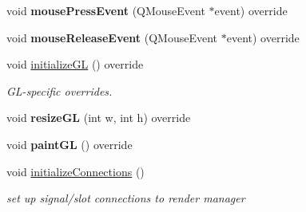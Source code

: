 \begin{Indent}
\begin{DoxyCompactItemize}
\item 
\mbox{\label{classrev_1_1_view_1_1_g_l_widget_abee840222096a37921495085b3519f33}} 
void {\bfseries mouse\+Press\+Event} (Q\+Mouse\+Event $\ast$event) override
\item 
\mbox{\label{classrev_1_1_view_1_1_g_l_widget_ad827e79a38c8aca729a87281f2d81414}} 
void {\bfseries mouse\+Release\+Event} (Q\+Mouse\+Event $\ast$event) override
\item 
\mbox{\label{classrev_1_1_view_1_1_g_l_widget_acdf6abd04212839bd08109e390547196}} 
void \mbox{\hyperlink{classrev_1_1_view_1_1_g_l_widget_acdf6abd04212839bd08109e390547196}{initialize\+GL}} () override
\begin{DoxyCompactList}\small\item\em G\+L-\/specific overrides. \end{DoxyCompactList}\item 
\mbox{\label{classrev_1_1_view_1_1_g_l_widget_a2ed48b66e84c02f0671f823db39821b0}} 
void {\bfseries resize\+GL} (int w, int h) override
\item 
\mbox{\label{classrev_1_1_view_1_1_g_l_widget_aa0824966d33a461a6e715e2ff036ee6a}} 
void {\bfseries paint\+GL} () override
\item 
\mbox{\label{classrev_1_1_view_1_1_g_l_widget_a19c5bb02e7379a6c684eb88530bc3cd9}} 
void \mbox{\hyperlink{classrev_1_1_view_1_1_g_l_widget_a19c5bb02e7379a6c684eb88530bc3cd9}{initialize\+Connections}} ()
\begin{DoxyCompactList}\small\item\em set up signal/slot connections to render manager \end{DoxyCompactList}\end{DoxyCompactItemize}
\end{Indent}
